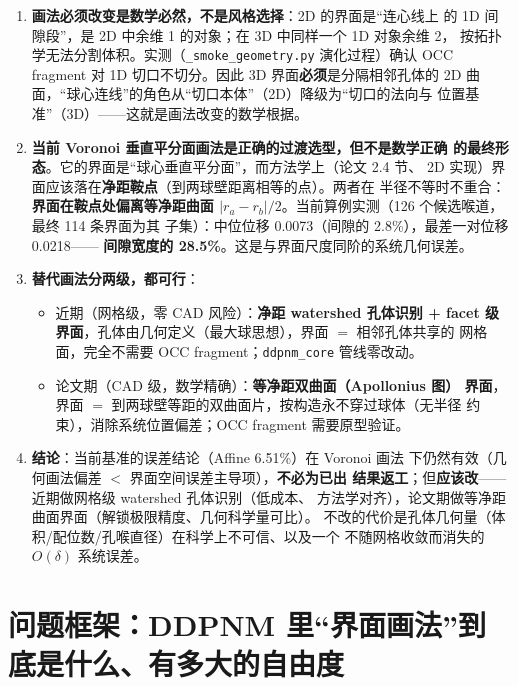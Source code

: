 \documentclass[11pt]{ctexart}
\begin{document}
\begin{enumerate}
  \item \textbf{画法必须改变是数学必然，不是风格选择}：2D 的界面是``连心线上
  的 1D 间隙段''，是 2D 中余维 1 的对象；在 3D 中同样一个 1D 对象余维 2，
  按拓扑学无法分割体积。实测（\texttt{\_smoke\_geometry.py} 演化过程）确认
  OCC fragment 对 1D 切口不切分。因此 3D 界面\textbf{必须}是分隔相邻孔体的
  2D 曲面，``球心连线''的角色从``切口本体''（2D）降级为``切口的法向与
  位置基准''（3D）——这就是画法改变的数学根据。

  \item \textbf{当前 Voronoi 垂直平分面画法是正确的过渡选型，但不是数学正确
  的最终形态}。它的界面是``球心垂直平分面''，而方法学上（论文 2.4 节、
  2D 实现）界面应该落在\textbf{净距鞍点}（到两球壁距离相等的点）。两者在
  半径不等时不重合：\textbf{界面在鞍点处偏离等净距曲面
  $|r_a-r_b|/2$}。当前算例实测（126 个候选喉道，最终 114 条界面为其
  子集）：中位位移 0.0073（间隙的 2.8\%），最差一对位移 0.0218——
  \textbf{间隙宽度的 28.5\%}。这是与界面尺度同阶的系统几何误差。

  \item \textbf{替代画法分两级，都可行}：
  \begin{itemize}
    \item 近期（网格级，零 CAD 风险）：\textbf{净距 watershed 孔体识别 +
    facet 级界面}，孔体由几何定义（最大球思想），界面 $=$ 相邻孔体共享的
    网格面，完全不需要 OCC fragment；\texttt{ddpnm\_core} 管线零改动。
    \item 论文期（CAD 级，数学精确）：\textbf{等净距双曲面（Apollonius 图）
    界面}，界面 $=$ 到两球壁等距的双曲面片，按构造永不穿过球体（无半径
    约束），消除系统位置偏差；OCC fragment 需要原型验证。
  \end{itemize}

  \item \textbf{结论}：当前基准的误差结论（Affine 6.51\%）在 Voronoi 画法
  下仍然有效（几何画法偏差 $<$ 界面空间误差主导项），\textbf{不必为已出
  结果返工}；但\textbf{应该改}——近期做网格级 watershed 孔体识别（低成本、
  方法学对齐），论文期做等净距曲面界面（解锁极限精度、几何科学量可比）。
  不改的代价是孔体几何量（体积/配位数/孔喉直径）在科学上不可信、以及一个
  不随网格收敛而消失的 $O(\delta)$ 系统误差。
\end{enumerate}

\section{问题框架：DDPNM 里``界面画法''到底是什么、有多大的自由度}
\end{document}
